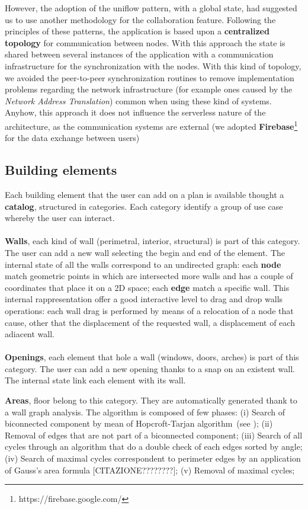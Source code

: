 However, the adoption of the uniflow pattern, with a global state, had suggested us to use another methodology for the collaboration feature. Following the principles of these patterns, the application is based upon a \textbf{centralized topology} for communication between nodes. With this approach the state is shared between several instances of the application with a communication infrastructure for the synchronization with the nodes. With this kind of topology, we avoided the peer-to-peer synchronization routines to remove implementation problems regarding the network infrastructure (for example ones caused by the \textit{Network Address Translation}) common when using these kind of systems. Anyhow, this approach it does not influence the serverless nature of the architecture, as the communication systems are external (we adopted \textbf{Firebase}\footnote{https://firebase.google.com/} for the data exchange between users)


\subsection{Building elements}\label{building_elements}

Each building element that the user can add on a plan is available thought a \textbf{catalog}, structured in categories. Each category identify a group of use case whereby the user can interact.\\\\
  \textbf{Walls}, each kind of wall (perimetral, interior, structural) is part of this category. The user can add a new wall selecting the begin and end of the element. The internal state of all the walls correspond to an undirected graph: each \textbf{node} match geometric points in which are intersected more walls and has a couple of coordinates that place it on a 2D space; each \textbf{edge} match a specific wall.
  This internal rappresentation offer a good interactive level to drag and drop walls operations: each wall drag is performed by means of a relocation of a node that cause, other that the displacement of the requested wall, a displacement of each adiacent wall.\\\\

  \textbf{Openings}, each element that hole a wall (windows, doors, arches) is part of this category. The user can add a new opening thanks to a snap on an existent wall. The internal state link each element with its wall.

   \textbf{Areas}, floor belong to this category. They are automatically generated thank to a wall graph analysis. The algorithm is composed of few phases: (i) Search of biconnected component by mean of Hopcroft-Tarjan algorithm~(see \cite{Hopcroft:1973:AEA:362248.362272}); (ii) Removal of edges that are not part of a biconnected component; (iii) Search of all cycles through an algorithm that do a double check of each edges sorted by angle; (iv) Search of maximal cycles correspondent to perimeter edges by an application of Gauss's area formula [CITAZIONE????????]; (v) Removal of maximal cycles;

